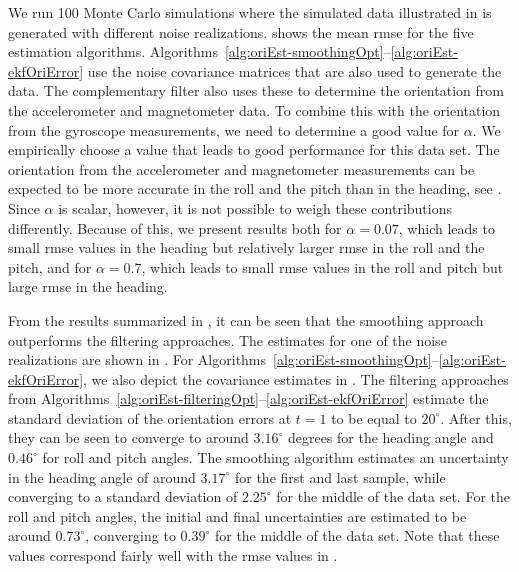 We run 100 Monte Carlo simulations where the simulated data illustrated in  is generated with different noise realizations.
 shows the mean \gls{rmse} for the five estimation algorithms. Algorithms~\ref{alg:oriEst-smoothingOpt}--\ref{alg:oriEst-ekfOriError} use the noise covariance matrices that are also used to generate the data. The complementary filter also uses these to determine the orientation from the accelerometer and magnetometer data. To combine this with the orientation from the gyroscope measurements, we need to determine a good value for $\alpha$. We empirically choose a value that leads to good performance for this data set. The orientation from the accelerometer and magnetometer measurements can be expected to be more accurate in the roll and the pitch than in the heading, see . Since $\alpha$ is scalar, however, it is not possible to weigh these contributions differently. Because of this, we present results both for $\alpha = 0.07$, which leads to small \gls{rmse} values in the heading but relatively larger \gls{rmse} in the roll and the pitch, and for $\alpha = 0.7$, which leads to small \gls{rmse} values in the roll and pitch but large \gls{rmse} in the heading. 

From the results summarized in , it can be seen that the smoothing approach outperforms the filtering approaches. The estimates for one of the noise realizations are shown in . For Algorithms~\ref{alg:oriEst-smoothingOpt}--\ref{alg:oriEst-ekfOriError}, we also depict the  covariance estimates in . The filtering approaches from Algorithms~\ref{alg:oriEst-filteringOpt}--\ref{alg:oriEst-ekfOriError} estimate the standard deviation of the orientation errors at $t = 1$ to be equal to $20^\circ$. After this, they can be seen to converge to around $3.16^\circ$ degrees for the heading angle and $0.46^\circ$ for roll and pitch angles. The smoothing algorithm estimates an uncertainty in the heading angle of around $3.17^\circ$ for the first and last sample, while converging to a standard deviation of $2.25^\circ$ for the middle of the data set. For the roll and pitch angles, the initial and final uncertainties are estimated to be around $0.73^\circ$, converging to $0.39^\circ$ for the middle of the data set. Note that these values correspond fairly well with the \gls{rmse} values in . 

